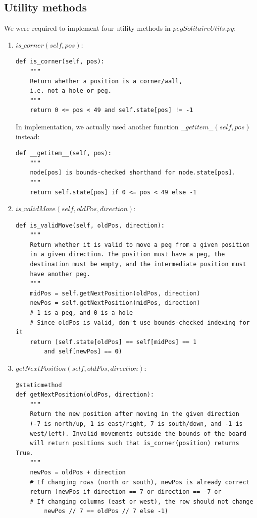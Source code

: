 \documentclass[11pt]{article}
\begin{document}
\subsection{Utility methods}

We were required to implement four utility methods in \(pegSolitaireUtils.py\):

\begin{enumerate}

\item \(is\_corner(self, pos)\):

\lstset{language=Python}
\begin{lstlisting}[frame=single]
def is_corner(self, pos):
	"""
	Return whether a position is a corner/wall,
	i.e. not a hole or peg.
	"""
	return 0 <= pos < 49 and self.state[pos] != -1
\end{lstlisting}

In implementation, we actually used another function
\(\_\_getitem\_\_(self, pos)\) instead:

\lstset{language=Python}
\begin{lstlisting}[frame=single]
def __getitem__(self, pos):
	"""
	node[pos] is bounds-checked shorthand for node.state[pos].
	"""
	return self.state[pos] if 0 <= pos < 49 else -1
\end{lstlisting}

\item \(is\_validMove(self, oldPos, direction)\):

\lstset{language=Python}
\begin{lstlisting}[frame=single]
def is_validMove(self, oldPos, direction):
	"""
	Return whether it is valid to move a peg from a given position
	in a given direction. The position must have a peg, the
	destination must be empty, and the intermediate position must
	have another peg.
	"""
	midPos = self.getNextPosition(oldPos, direction)
	newPos = self.getNextPosition(midPos, direction)
	# 1 is a peg, and 0 is a hole
	# Since oldPos is valid, don't use bounds-checked indexing for it
	return (self.state[oldPos] == self[midPos] == 1
		and self[newPos] == 0)
\end{lstlisting}

\item \(getNextPosition(self, oldPos, direction)\):

\lstset{language=Python}
\begin{lstlisting}[frame=single]
@staticmethod
def getNextPosition(oldPos, direction):
	"""
	Return the new position after moving in the given direction
	(-7 is north/up, 1 is east/right, 7 is south/down, and -1 is
	west/left). Invalid movements outside the bounds of the board
	will return positions such that is_corner(position) returns True.
	"""
	newPos = oldPos + direction
	# If changing rows (north or south), newPos is already correct
	return (newPos if direction == 7 or direction == -7 or
	# If changing columns (east or west), the row should not change
		newPos // 7 == oldPos // 7 else -1)
\end{lstlisting}


\end{enumerate}
\end{document}
